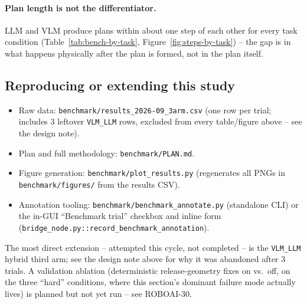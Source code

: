 \paragraph{Plan length is not the differentiator.} LLM and VLM produce plans
within about one step of each other for every task condition
(Table~\ref{tab:bench-by-task}, Figure~\ref{fig:steps-by-task}) -- the gap is
in what happens physically after the plan is formed, not in the plan
itself.

\subsection{Reproducing or extending this study}

\begin{itemize}[nosep]
  \item Raw data: \texttt{benchmark/results\_2026-09\_3arm.csv} (one row per
    trial; includes 3 leftover \texttt{VLM\_LLM} rows, excluded from every
    table/figure above -- see the design note).
  \item Plan and full methodology: \texttt{benchmark/PLAN.md}.
  \item Figure generation: \texttt{benchmark/plot\_results.py} (regenerates
    all PNGs in \texttt{benchmark/figures/} from the results CSV).
  \item Annotation tooling: \texttt{benchmark/benchmark\_annotate.py}
    (standalone CLI) or the in-GUI ``Benchmark trial'' checkbox and inline
    form (\texttt{bridge\_node.py::record\_benchmark\_annotation}).
\end{itemize}

The most direct extension -- attempted this cycle, not completed -- is the
\texttt{VLM\_LLM} hybrid third arm; see the design note above for why it was
abandoned after 3 trials. A validation ablation (deterministic
release-geometry fixes on vs.\ off, on the three ``hard'' conditions, where
this section's dominant failure mode actually lives) is planned but not yet
run -- see ROBOAI-30.
